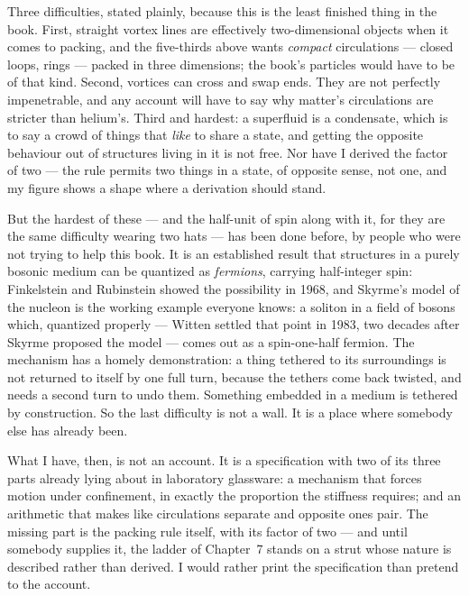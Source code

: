 Three difficulties, stated plainly, because this is the least finished thing in the book. First, straight vortex lines are effectively two-dimensional objects when it comes to packing, and the five-thirds above wants \emph{compact} circulations --- closed loops, rings --- packed in three dimensions; the book's particles would have to be of that kind. Second, vortices can cross and swap ends. They are not perfectly impenetrable, and any account will have to say why matter's circulations are stricter than helium's. Third and hardest: a superfluid is a condensate, which is to say a crowd of things that \emph{like} to share a state, and getting the opposite behaviour out of structures living in it is not free. Nor have I derived the factor of two --- the rule permits two things in a state, of opposite sense, not one, and my figure shows a shape where a derivation should stand.

But the hardest of these --- and the half-unit of spin along with it, for they are the same difficulty wearing two hats --- has been done before, by people who were not trying to help this book. It is an established result that structures in a purely bosonic medium can be quantized as \emph{fermions}, carrying half-integer spin: Finkelstein and Rubinstein showed the possibility in 1968, and Skyrme's model of the nucleon is the working example everyone knows: a soliton in a field of bosons which, quantized properly --- Witten settled that point in 1983, two decades after Skyrme proposed the model --- comes out as a spin-one-half fermion. The mechanism has a homely demonstration: a thing tethered to its surroundings is not returned to itself by one full turn, because the tethers come back twisted, and needs a second turn to undo them. Something embedded in a medium is tethered by construction. So the last difficulty is not a wall. It is a place where somebody else has already been.

What I have, then, is not an account. It is a specification with two of its three parts already lying about in laboratory glassware: a mechanism that forces motion under confinement, in exactly the proportion the stiffness requires; and an arithmetic that makes like circulations separate and opposite ones pair. The missing part is the packing rule itself, with its factor of two --- and until somebody supplies it, the ladder of Chapter~7 stands on a strut whose nature is described rather than derived. I would rather print the specification than pretend to the account.


